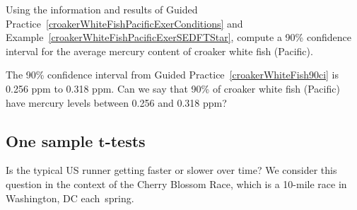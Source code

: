 \begin{exercisewrap}
\begin{nexercise}
\label{croakerWhiteFish90ci}
Using the information and results of Guided Practice~\ref{croakerWhiteFishPacificExerConditions} and Example~\ref{croakerWhiteFishPacificExerSEDFTStar}, compute a 90\% confidence interval for the average mercury content of croaker white fish (Pacific).\footnotemark{}
\end{nexercise}
\end{exercisewrap}

\begin{exercisewrap}
\begin{nexercise}
The 90\% confidence interval from
Guided Practice~\ref{croakerWhiteFish90ci}
is 0.256 ppm to 0.318 ppm.
Can we say that 90\% of croaker white fish (Pacific)
have mercury levels between 0.256 and 0.318 ppm?\footnotemark{}
\end{nexercise}
\end{exercisewrap}




\subsection[One sample $t$-tests]
    {One sample $\pmb{t}$-tests}
\label{oneSampleTTests}

\newcommand{\cherryblossomn}{100}
\newcommand{\cherryblossommean}{97.32}
\newcommand{\cherryblossomnull}{93.29}
\newcommand{\cherryblossomsd}{16.98}
\newcommand{\cherryblossomse}{1.70}
\newcommand{\cherryblossomz}{2.37}

\noindent%
Is the typical US runner getting faster or slower over time? We consider this question in the context of the Cherry Blossom Race, which is a 10-mile race in Washington, DC each~spring.

